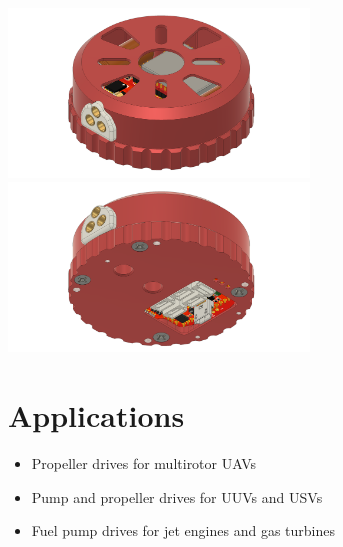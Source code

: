 \documentclass{zubaxdoc}
\begin{document}
\begin{titlepage}
\centering
\includegraphics[width=0.6\textwidth]{top_view.png}
\includegraphics[width=0.6\textwidth]{bottom_view.png}

\section*{Applications}

\begin{itemize}
    \item Propeller drives for multirotor UAVs
    \item Pump and propeller drives for UUVs and USVs
    \item Fuel pump drives for jet engines and gas turbines
\end{itemize}

\end{titlepage}

\tableofcontents
\BeginRightColumn
\listoffigures
\listoftables

\mainmatter







\end{document}
